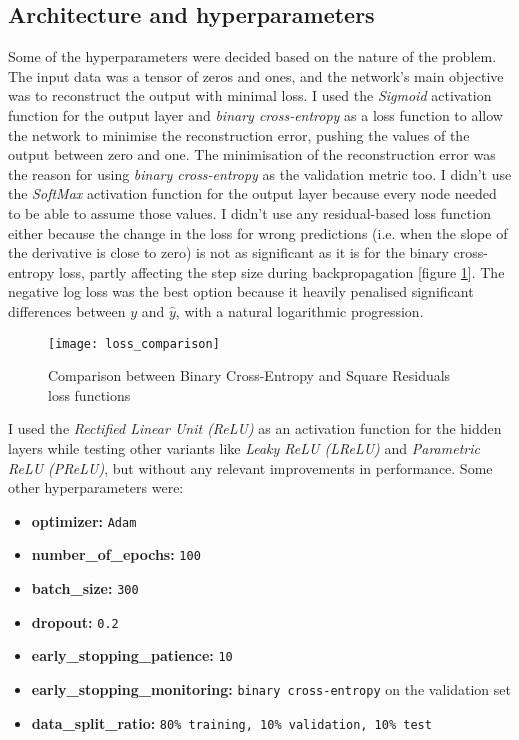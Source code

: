 \subsection{Architecture and hyperparameters}

Some of the hyperparameters were decided based on the nature of the problem.
The input data was a tensor of zeros and ones, and the network's main objective was to reconstruct the output with minimal loss.
I used the \textit{Sigmoid} activation function for the output layer and \textit{binary cross-entropy} as a loss function
to allow the network to minimise the reconstruction error, pushing the values of the output between zero and one.
The minimisation of the reconstruction error was the reason for using \textit{binary cross-entropy} as the validation metric too.
I didn't use the \textit{SoftMax} activation function for the output layer because every node needed to be able to assume those values.
I didn't use any residual-based loss function either because the change in the loss for wrong predictions
(i.e. when the slope of the derivative is close to zero) is not as significant as it is for the binary cross-entropy loss,
partly affecting the step size during backpropagation [figure \ref{fig:loss_comparison}].
The negative log loss was the best option because it heavily penalised significant differences between $y$ and $\hat{y}$,
with a natural logarithmic progression.

\begin{figure}[H]
  \centering
  \texttt{[image: loss\_comparison]}
  \caption{Comparison between Binary Cross-Entropy and Square Residuals loss functions}
  \label{fig:loss_comparison}
\end{figure}

I used the \textit{Rectified Linear Unit (ReLU)} as an activation function for the hidden layers
while testing other variants like \textit{Leaky ReLU (LReLU)} and \textit{Parametric ReLU (PReLU)},
but without any relevant improvements in performance.
Some other hyperparameters were:

\begin{itemize}
  \item \textbf{optimizer:} \verb|Adam|
  \item \textbf{number\_of\_epochs:} \verb|100|
  \item \textbf{batch\_size:} \verb|300|
  \item \textbf{dropout:} \verb|0.2|
  \item \textbf{early\_stopping\_patience:} \verb|10|
  \item \textbf{early\_stopping\_monitoring:} \verb|binary cross-entropy| on the validation set
  \item \textbf{data\_split\_ratio:} \verb|80% training, 10% validation, 10% test|
\end{itemize}

